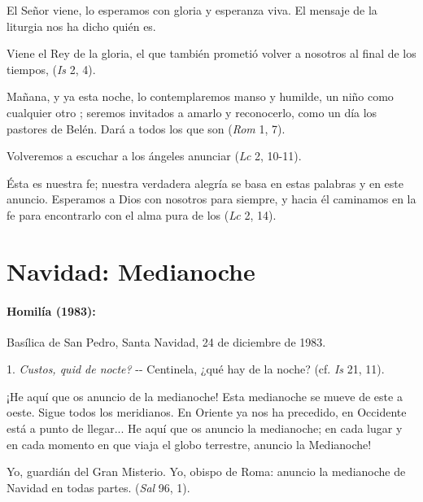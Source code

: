 \begin{body}
\begin{body}
		El Señor viene, lo esperamos con gloria y esperanza viva. El mensaje de la liturgia nos ha dicho quién es.
		
		Viene el Rey de la gloria, el que también prometió volver a nosotros al final de los tiempos,  (\emph{Is} 2, 4).
		
		Mañana, y ya esta noche, lo contemplaremos manso y humilde, un niño como cualquier otro ; seremos invitados a amarlo y reconocerlo, como un día los pastores de Belén. Dará  a todos los que son  (\emph{Rom} 1, 7).
		
		Volveremos a escuchar a los ángeles anunciar  (\emph{Lc} 2, 10-11).
		
		Ésta es nuestra fe; nuestra verdadera alegría se basa en estas palabras y en este anuncio. Esperamos a Dios con nosotros para siempre, y hacia él caminamos en la fe para encontrarlo con el alma pura de los  (\emph{Lc} 2, 14).
	\end{body}
	
	\chapter{Navidad: Medianoche}
	
	\subsubsection{Homilía (1983): }
	
	Basílica de San Pedro, Santa Navidad, 24 de diciembre de 1983.
	
	\begin{body}
		1. \emph{Custos, quid de nocte?} -\/- Centinela, ¿qué hay de la noche? (cf. \emph{Is} 21, 11).
		
		¡He aquí que os anuncio de la medianoche! Esta medianoche se mueve de este a oeste. Sigue todos los meridianos. En Oriente ya nos ha precedido, en Occidente está a punto de llegar... He aquí que os anuncio la medianoche; en cada lugar y en cada momento en que viaja el globo terrestre, anuncio la Medianoche!
		
		Yo, guardián del Gran Misterio. Yo, obispo de Roma: anuncio la medianoche de Navidad en todas partes.  (\emph{Sal} 96, 1).
		

\end{body}
\end{body}
